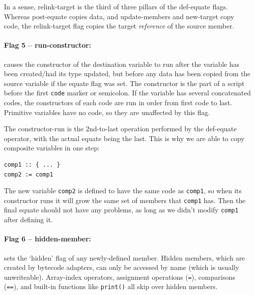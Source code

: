 \documentclass{article}
\newenvironment{code}{
       \begin{list}{}{
               \setlength{\leftmargin}{.4in}
               \setlength{\rightmargin}{0in}
               \setlength{\topsep}{.2in}
       }
       \small
       \item[] }
       { \end{list}   }
\begin{document}
In a sense, relink-target is the third of three pillars of the def-equate flags.  Whereas post-equate copies data, and update-members and new-target copy code, the relink-target flag copies the target \emph{reference} of the source member.\\


\paragraph{Flag 5 -- run-constructor:}  causes the constructor of the destination variable to run after the variable has been created/had its type updated, but before any data has been copied from the source variable if the equate flag was set.  The constructor is the part of a script before the first \verb#code# marker or semicolon.  If the variable has several concatenated codes, the constructors of each code are run in order from first code to last.  Primitive variables have no code, so they are unaffected by this flag.

The constructor-run is the 2nd-to-last operation performed by the def-equate operator, with the actual equate being the last.  This is why we are able to copy composite variables in one step:

\begin{code} \begin{verbatim}
comp1 :: { ... }
comp2 := comp1
\end{verbatim} \end{code}

\noindent The new variable \verb#comp2# is defined to have the same code as \verb#comp1#, so when its constructor runs it will grow the same set of members that \verb#comp1# has.  Then the final equate should not have any problems, as long as we didn't modify \verb#comp1# after defining it.\\


\paragraph{Flag 6 -- hidden-member:}  sets the `hidden' flag of any newly-defined member.  Hidden members, which are created by bytecode adapters, can only be accessed by name (which is usually unwriteable).  Array-index operators, assignment operations (\verb#=#), comparisons (\verb#==#), and built-in functions like \verb#print()# all skip over hidden members.\\
\end{document}
